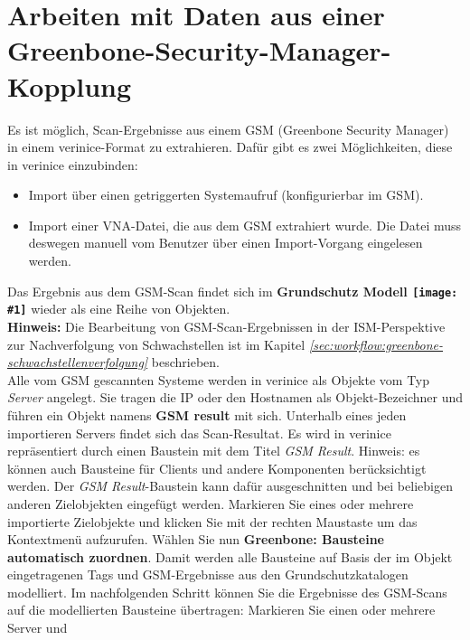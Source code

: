 \documentclass[a4paper,10pt]{book}
\newcommand{\icon}[1]{\texttt{[image: \#1]}}
\begin{document}
\section{Arbeiten mit Daten aus einer Greenbone-Security-Manager-Kopplung} \label{Arbeiten mit Daten aus einer Greenbone-Security-Manager-Kopplung}
Es ist möglich, Scan-Ergebnisse aus einem GSM (Greenbone Security Manager) in einem verinice-Format zu extrahieren.
Dafür gibt es zwei Möglichkeiten, diese in verinice einzubinden:
 \begin{itemize}
   \item Import über einen getriggerten Systemaufruf (konfigurierbar im GSM).
   \item Import einer VNA-Datei, die aus dem GSM extrahiert wurde. Die Datei muss deswegen manuell vom Benutzer
   über einen Import-Vorgang eingelesen werden.
 \end{itemize}
 Das Ergebnis aus dem GSM-Scan findet sich im \textbf{Grundschutz Modell \icon{Icon/GS_Modell.png}} wieder als eine Reihe von Objekten.
 \newline\\
 \textbf{Hinweis:} Die Bearbeitung von GSM-Scan-Ergebnissen in der ISM-Perspektive zur Nachverfolgung von Schwachstellen
 ist im Kapitel {\em \ref{sec:workflow:greenbone-schwachstellenverfolgung} \newline {}} beschrieben.
 \newline\\
Alle vom GSM gescannten Systeme werden in verinice als Objekte vom Typ
{\em Server} angelegt. Sie tragen die IP oder den Hostnamen als Objekt-Bezeichner und führen ein Objekt namens \textbf{GSM result} mit sich.
Unterhalb eines jeden importieren Servers findet sich das Scan-Resultat.
Es wird in verinice repräsentiert durch einen Baustein mit dem Titel
{\em GSM Result}.
Hinweis: es können auch Bausteine für Clients und andere Komponenten
berücksichtigt werden. Der {\em GSM Result}-Baustein kann dafür ausgeschnitten und
bei beliebigen anderen Zielobjekten eingefügt werden.
 Markieren Sie eines oder mehrere importierte Zielobjekte und klicken Sie mit der rechten Maustaste um das Kontextmenü aufzurufen. Wählen Sie nun
 \textbf{Greenbone: Bausteine automatisch zuordnen}. Damit werden alle Bausteine auf Basis
 der im Objekt eingetragenen Tags und GSM-Ergebnisse aus den Grundschutzkatalogen modelliert.
 Im nachfolgenden Schritt können Sie die Ergebnisse des GSM-Scans auf die modellierten Bausteine übertragen:
 Markieren Sie einen oder mehrere Server und
\end{document}
